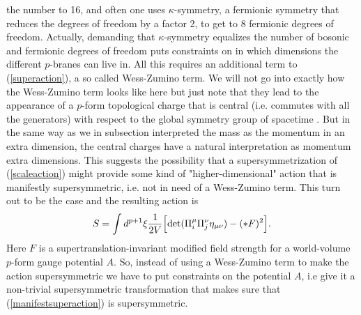 the number to 16, and often one uses $\kappa$-symmetry, a fermionic symmetry that reduces the degrees of freedom by a factor 2, to get to 8 fermionic degrees of freedom. 
Actually, demanding that $\kappa$-symmetry equalizes the number of bosonic and fermionic degrees of freedom puts constraints 
on in which dimensions the different $p$-branes can live in. All this requires an additional term to (\ref{superaction}), a so called Wess-Zumino term. 
We will not go into exactly how the Wess-Zumino term looks like here but just note that they lead to the appearance of a $p$-form topological 
charge that is central (i.e. commutes with all the generators) with respect to the global symmetry group of spacetime \cite{valskriven}. 
But in the same way as we in subsection  interpreted the mass as the momentum in an extra dimension, the central charges have a natural interpretation 
as momentum extra dimensions. This suggests the possibility that a supersymmetrization of (\ref{scaleaction}) might 
provide some kind of "higher-dimensional" action that is manifestly supersymmetric, i.e. not in need of a Wess-Zumino term.
This turn out to be the case and the resulting action is
\begin{equation}
S=\int d^{p+1} \xi {1 \over 2V}\Big{[}\mbox{det}(\Pi_{i}^{\mu}\Pi_{j}^{\nu} \eta_{\mu \nu}) - (*F)^2\Big{]}.
\label{manifestsuperaction}
\end{equation}
Here $F$ is a supertranslation-invariant modified field strength for a world-volume $p$-form gauge potential $A$.
So, instead of using a Wess-Zumino term to make the action supersymmetric we have to put constraints on the potential $A$, i.e give it a non-trivial supersymmetric transformation 
that makes sure that (\ref{manifestsuperaction}) is supersymmetric.

